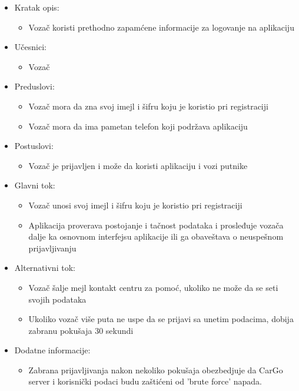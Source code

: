 \begin{itemize}
    \item Kratak opis:
        \begin{itemize}
            \item Vozač koristi prethodno zapamćene informacije za logovanje na aplikaciju
        \end{itemize}
    \item Učesnici:
        \begin{itemize}
            \item Vozač
        \end{itemize}
    \item Preduslovi:
        \begin{itemize}
            \item Vozač mora da zna svoj imejl i šifru koju je koristio pri registraciji
            \item Vozač mora da ima pametan telefon koji podržava aplikaciju
        \end{itemize}
    \item Postuslovi:
        \begin{itemize}
            \item Vozač je prijavljen i može da koristi aplikaciju i vozi putnike
        \end{itemize}
    \item Glavni tok:
        \begin{itemize}
            \item Vozač unosi svoj imejl i šifru koju je koristio pri registraciji
            \item Aplikacija proverava postojanje i tačnost podataka i prosleđuje vozača dalje ka osnovnom interfejsu aplikacije ili ga obaveštava o neuspešnom prijavljivanju
        \end{itemize}
    \item Alternativni tok:
        \begin{itemize}
            \item Vozač šalje mejl kontakt centru za pomoć, ukoliko ne može da se seti svojih podataka
            \item Ukoliko vozač više puta ne uspe da se prijavi sa unetim podacima, dobija zabranu pokušaja 30 sekundi
        \end{itemize}
    \item Dodatne informacije:
        \begin{itemize}
            \item Zabrana prijavljivanja nakon nekoliko pokušaja obezbedjuje da CarGo server i korisnički podaci budu zaštićeni od 'brute force' napada.
        \end{itemize}
\end{itemize}



